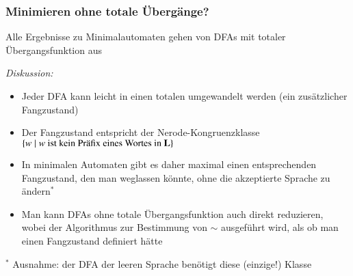 \documentclass[onlymath]{beamer}
\begin{document}
\begin{frame}\frametitle{Minimieren ohne totale Übergänge?}

Alle Ergebnisse zu Minimalautomaten gehen von DFAs mit \alert{totaler} Übergangsfunktion aus
\medskip

\emph{Diskussion:}
\begin{itemize}
\item Jeder DFA kann leicht in einen totalen umgewandelt werden (ein zusätzlicher Fangzustand)
\item Der Fangzustand entspricht der Nerode-Kongruenzklasse $\{w\mid w\text{ ist kein Präfix eines Wortes in }\textbf{\textcolor{black}{L}}\}$
\item In minimalen Automaten gibt es daher maximal einen entsprechenden Fangzustand, den man weglassen könnte, ohne die akzeptierte Sprache zu ändern${}^*$
\item Man kann DFAs ohne totale Übergangsfunktion auch direkt reduzieren, wobei der Algorithmus zur Bestimmung von $\sim$ ausgeführt wird, als ob man einen Fangzustand definiert hätte
\end{itemize}
{\tiny ${}^*$ Ausnahme: der DFA der leeren Sprache benötigt diese (einzige!) Klasse}

\end{frame}
\end{document}
